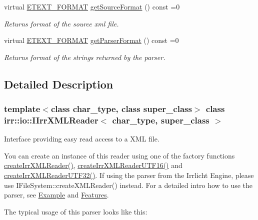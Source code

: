 \begin{CompactItemize}
virtual \hyperlink{namespaceirr_1_1io_c7e51e5a6bd00451dec248f497b16a9d}{ETEXT\_\-FORMAT} \hyperlink{classirr_1_1io_1_1_i_irr_x_m_l_reader_00998ef2d3a562d6b2b8302c3430322d}{getSourceFormat} () const =0
\begin{CompactList}\small\item\em Returns format of the source xml file. \item\end{CompactList}\item 
virtual \hyperlink{namespaceirr_1_1io_c7e51e5a6bd00451dec248f497b16a9d}{ETEXT\_\-FORMAT} \hyperlink{classirr_1_1io_1_1_i_irr_x_m_l_reader_9af7e323c292a4836bf4a7c093b4d85a}{getParserFormat} () const =0
\begin{CompactList}\small\item\em Returns format of the strings returned by the parser. \item\end{CompactList}\end{CompactItemize}


\subsection{Detailed Description}
\subsubsection*{template$<$class char\_\-type, class super\_\-class$>$ class irr::io::IIrrXMLReader$<$ char\_\-type, super\_\-class $>$}

Interface providing easy read access to a XML file. 

You can create an instance of this reader using one of the factory functions \hyperlink{namespaceirr_1_1io_a79dd5b9dae1b75be3dec4374176a5ce}{createIrrXMLReader()}, \hyperlink{namespaceirr_1_1io_41c9d4c0d94702b3da2dca5799384443}{createIrrXMLReaderUTF16()} and \hyperlink{namespaceirr_1_1io_42c53128ecf88af927030b6b9ea5afc2}{createIrrXMLReaderUTF32()}. If using the parser from the Irrlicht Engine, please use IFileSystem::createXMLReader() instead. For a detailed intro how to use the parser, see \hyperlink{irrXML.h_irrxmlexample}{Example} and \hyperlink{irrXML.h_features}{Features}.

The typical usage of this parser looks like this: 

